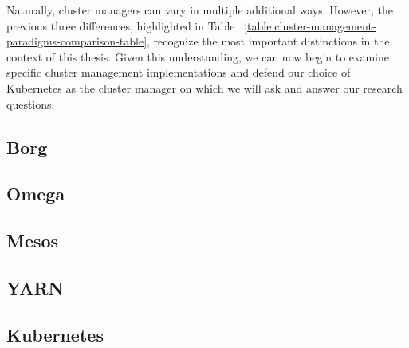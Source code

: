 Naturally, cluster managers can vary in multiple additional ways. However,
the previous three differences, highlighted in Table
~\ref{table:cluster-management-paradigms-comparison-table}, recognize the most
important distinctions in
the context of this thesis. Given this understanding, we can now begin to examine specific
cluster management implementations and defend our choice of Kubernetes as the
cluster manager on which we will ask and answer our research questions.

\subsection{Borg}



\subsection{Omega}





\subsection{Mesos}



\subsection{YARN}



\subsection{Kubernetes}



